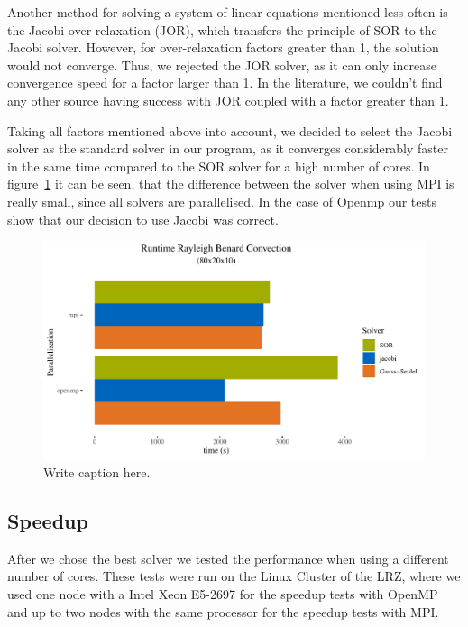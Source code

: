 \documentclass{article}%
\begin{document}
Another method for solving a system of linear equations mentioned less often is the Jacobi over-relaxation (JOR), which transfers the principle of SOR to the Jacobi solver. However, for over-relaxation factors greater than 1, the solution would not converge. Thus, we rejected the JOR solver, as it can only increase convergence speed for a factor larger than 1. In the literature, we couldn’t find any other source having success with JOR coupled with a factor greater than 1.

Taking all factors mentioned above into account, we decided to select the Jacobi solver as the standard solver in our program, as it converges considerably faster in the same time compared to the SOR solver for a high number of cores. In figure~\ref{fig:solver} it can be seen, that the difference between the solver when using MPI is really small, since all solvers are parallelised. In the case of Openmp our tests show that our decision to use Jacobi was correct.

\begin{figure}[htb]
\centering
\includegraphics[width=1\linewidth]{../tests/graphs/runtime_rayleigh_benard_convection_8-2-1_solver.pdf}
\caption{Write caption here.}
\label{fig:solver}
\end{figure}


\subsection{Speedup}
After we chose the best solver we tested the performance when using a different number of cores. These tests were run on the Linux Cluster of the LRZ, where we used one node with a Intel Xeon E5-2697 for the speedup tests with OpenMP and up to two nodes with the same processor for the speedup tests with MPI.
\end{document}
